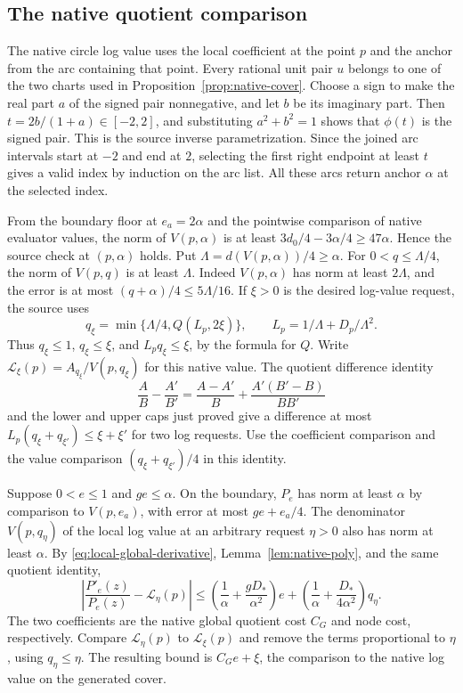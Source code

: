 \documentclass[11pt]{amsart}
\theoremstyle{definition}
\theoremstyle{remark}
\numberwithin{equation}{section}
\begin{document}
\subsection{The native quotient comparison}

The native circle log value uses the local coefficient
at the point $p$ and the anchor from the arc containing
that point. Every rational unit pair $u$ belongs to
one of the two charts used in
Proposition~\ref{prop:native-cover}. Choose a sign to
make the real part $a$ of the signed pair nonnegative,
and let $b$ be its imaginary part. Then
$t=2b/(1+a)\in[-2,2]$, and substituting $a^2+b^2=1$
shows that $\phi(t)$ is the signed pair. This is the
source inverse parametrization. Since the joined arc
intervals start at $-2$ and end at $2$, selecting the
first right endpoint at least $t$ gives a valid index by
induction on the arc list. All these arcs return anchor
$\alpha$ at the selected index.

From the boundary floor at $e_a=2\alpha$ and the
pointwise comparison of native evaluator values,
the norm of $V(p,\alpha)$ is at least
$3d_0/4-3\alpha/4\ge47\alpha$.
Hence the source check at $(p,\alpha)$ holds.
Put $\Lambda=d(V(p,\alpha))/4\ge\alpha$. For
$0<q\le\Lambda/4$, the norm of $V(p,q)$ is at least
$\Lambda$. Indeed $V(p,\alpha)$ has norm at least
$2\Lambda$, and the error is at most
$(q+\alpha)/4\le5\Lambda/16$.
If $\xi>0$ is the desired log-value request, the source
uses
\[
 q_\xi=\min\{\Lambda/4,Q(L_p,2\xi)\},\qquad
 L_p=1/\Lambda+D_p/\Lambda^2 .
\]
Thus $q_\xi\le1$, $q_\xi\le\xi$, and $L_p q_\xi\le\xi$,
by the formula for $Q$. Write
$\mathcal L_\xi(p)=A_{q_\xi}/V(p,q_\xi)$
for this native value.
The quotient difference identity
\[
 \frac{A}{B}-\frac{A'}{B'}
    =\frac{A-A'}{B}+\frac{A'(B'-B)}{BB'}
\]
and the lower and upper caps just proved give a difference
at most $L_p(q_\xi+q_{\xi'})\le\xi+\xi'$ for two
log requests. Use the coefficient comparison and the
value comparison $(q_\xi+q_{\xi'})/4$ in this identity.

Suppose $0<e\le1$ and $ge\le\alpha$. On the boundary,
$P_e$ has norm at least $\alpha$ by comparison to
$V(p,e_a)$, with error at most $ge+e_a/4$.
The denominator $V(p,q_\eta)$ of the local log value
at an arbitrary request $\eta>0$ also has norm at least
$\alpha$. By \eqref{eq:local-global-derivative},
Lemma~\ref{lem:native-poly}, and the same quotient identity,
\[
 \left|\frac{P'_e(z)}{P_e(z)}-\mathcal L_\eta(p)\right|
 \le \left(\frac1\alpha+\frac{gD_*}{\alpha^2}\right)e
      +\left(\frac1\alpha+\frac{D_*}{4\alpha^2}\right)q_\eta .
\]
The two coefficients are the native global quotient
cost $C_G$ and node cost, respectively. Compare
$\mathcal L_\eta(p)$ to $\mathcal L_\xi(p)$ and remove
the terms proportional to $\eta$, using $q_\eta\le\eta$.
The resulting bound is $C_Ge+\xi$, the comparison to
the native log value on the generated cover.
\end{document}
